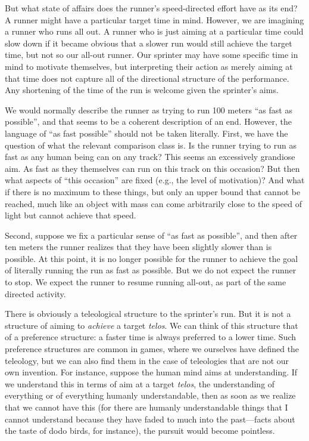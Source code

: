 But what state of affairs does the runner's speed-directed effort have as its end? A runner might have a particular target time in mind.
However, we are imagining a runner who runs all out. A runner who is just aiming at a particular time could slow down if it became obvious
that a slower run would still achieve the target time, but not so our all-out runner. Our sprinter may have some specific time in mind
to motivate themselves, but interpreting their action as merely aiming at that time does not capture all of the directional structure 
of the performance. Any shortening of the time of the run is welcome given the sprinter's aims. 

We would normally describe the runner as trying to run 100 meters ``as fast as possible'', and that seems to be a coherent description
of an end. However, the language of ``as fast possible'' should not be taken literally. First, we have the question of what the relevant
comparison class is. Is the runner trying to run as fast as any human being can on any track? This seems an excessively
grandiose aim. As fast as they themselves can run on this track on this occasion? But then what aspects of ``this occasion'' are 
fixed (e.g., the level of motivation)? And what if there is no maximum to these things, but only an upper bound that cannot be reached, much like
an object with mass can come arbitrarily close to the speed of light but cannot achieve that speed.

Second, suppose we fix a particular sense of ``as fast as possible'', and then after ten meters the runner realizes that they have
been slightly slower than is possible. At this point, it is no longer possible for the runner to achieve the goal of literally running
the run as fast as possible. But we do not expect the runner to stop. We expect the runner to resume running all-out, as part of the
same directed activity.

There is obviously a teleological structure to the sprinter's run. But it is not a structure of aiming to \textit{achieve} a 
target \textit{telos}. 
We can think of this structure that of a preference structure: a faster time is always preferred to a lower time. 
Such preference structures are common in games, where we ourselves have defined the teleology, but we can also find them in the 
case of teleologies that are not our own invention. For instance, suppose the human mind aims at understanding. If we understand
this in terms of aim at a target \textit{telos}, the understanding of everything or of everything humanly understandable, then as soon as 
we realize that we cannot have this (for there are humanly understandable things that I cannot understand because they have faded to much
into the past---facts about the taste of dodo birds, for instance), the pursuit would become pointless. 

